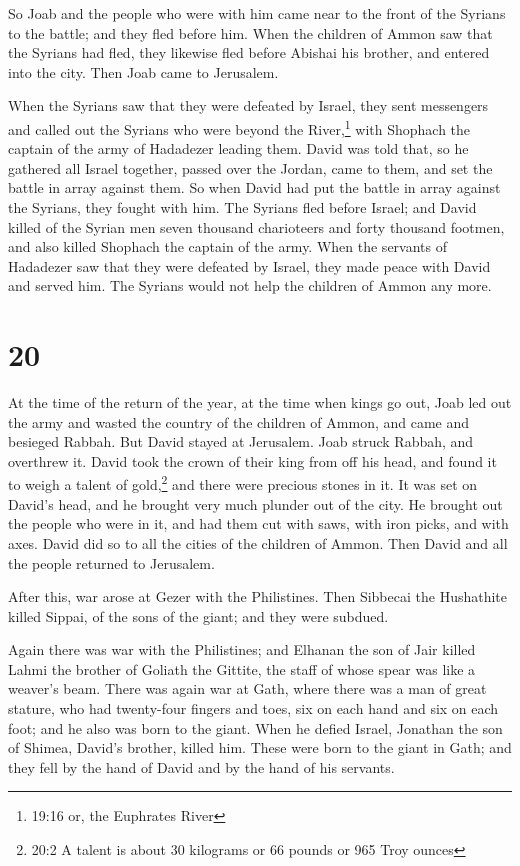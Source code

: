  So Joab and the people who were with him came near to the
front of the Syrians to the battle; and they fled before him.
 When the children of Ammon saw that the Syrians had fled,
they likewise fled before Abishai his brother, and entered into the
city. Then Joab came to Jerusalem.

 When the Syrians saw that they were defeated by Israel,
they sent messengers and called out the Syrians who were beyond the
River,\footnote{19:16 or, the Euphrates River} with Shophach the captain
of the army of Hadadezer leading them.  David was told
that, so he gathered all Israel together, passed over the Jordan, came
to them, and set the battle in array against them. So when David had put
the battle in array against the Syrians, they fought with him.
 The Syrians fled before Israel; and David killed of the
Syrian men seven thousand charioteers and forty thousand footmen, and
also killed Shophach the captain of the army.  When the
servants of Hadadezer saw that they were defeated by Israel, they made
peace with David and served him. The Syrians would not help the children
of Ammon any more.

\hypertarget{section-19}{%
\section{20}\label{section-19}}

 At the time of the return of the year, at the time when
kings go out, Joab led out the army and wasted the country of the
children of Ammon, and came and besieged Rabbah. But David stayed at
Jerusalem. Joab struck Rabbah, and overthrew it.  David took
the crown of their king from off his head, and found it to weigh a
talent of gold,\footnote{20:2 A talent is about 30 kilograms or 66
  pounds or 965 Troy ounces} and there were precious stones in it. It
was set on David's head, and he brought very much plunder out of the
city.  He brought out the people who were in it, and had
them cut with saws, with iron picks, and with axes. David did so to all
the cities of the children of Ammon. Then David and all the people
returned to Jerusalem.

 After this, war arose at Gezer with the Philistines. Then
Sibbecai the Hushathite killed Sippai, of the sons of the giant; and
they were subdued.

 Again there was war with the Philistines; and Elhanan the
son of Jair killed Lahmi the brother of Goliath the Gittite, the staff
of whose spear was like a weaver's beam.  There was again
war at Gath, where there was a man of great stature, who had twenty-four
fingers and toes, six on each hand and six on each foot; and he also was
born to the giant.  When he defied Israel, Jonathan the son
of Shimea, David's brother, killed him.  These were born to
the giant in Gath; and they fell by the hand of David and by the hand of
his servants.

